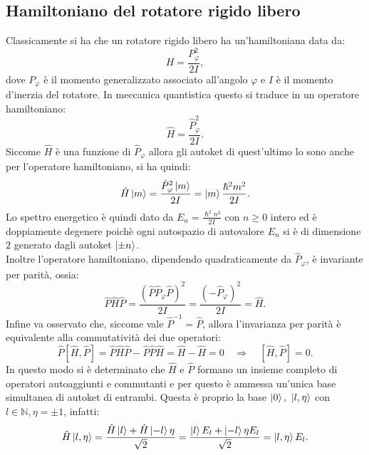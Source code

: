 \subsection{Hamiltoniano del rotatore rigido libero}
Classicamente si ha che un rotatore rigido libero ha un'hamiltoniana data da:
\begin{equation*}
    H=\frac{P^2_\varphi}{2I},
\end{equation*}
dove $P_\varphi$ è il momento generalizzato associato all'angolo $\varphi$ e $I$ è il momento d'inerzia del rotatore. In meccanica quantistica questo si traduce in un operatore hamiltoniano:
\begin{equation*}
    \hat H=\frac{\hat P^2_\varphi}{2I}.
\end{equation*}
Siccome $\hat H$ è una funzione di $\hat P_\varphi$ allora gli autoket di quest'ultimo lo sono anche per l'operatore hamiltoniano, si ha quindi:
\begin{equation*}
    \hat H\ket{m}=\frac{\hat P^2_\varphi\ket{m}}{2I}=\ket{m}\frac{\hslash^2m^2}{2I}.
\end{equation*}
Lo spettro energetico è quindi dato da $E_n=\frac{\hslash^2n^2}{2I}$ con $n\geq0$ intero ed è doppiamente degenere poichè ogni autospazio di autovalore $E_n$ si è di dimensione $2$ generato dagli autoket $\ket{\pm n}$.\\Inoltre l'operatore hamiltoniano, dipendendo quadraticamente da $\hat P_\varphi$, è invariante per parità, ossia:
\begin{equation*}
    \hat P\hat H \hat P=\frac{(\hat P\hat P_\varphi\hat P)^2}{2I}=\frac{(-\hat P_\varphi)^2}{2I}=\hat H.
\end{equation*}
Infine va osservato che, siccome vale $\hat P^{-1}=\hat P$, allora l'invarianza per parità è equivalente alla commutatività dei due operatori:
\begin{equation*}
    \hat P[\hat H,\hat P]=\hat P\hat H\hat P-\hat P\hat P\hat H=\hat H-\hat H=0\quad \Rightarrow \quad [\hat H,\hat P]=0.
\end{equation*}
In questo modo si è determinato che $\hat H$ e $\hat P$ formano un insieme completo di operatori autoaggiunti e commutanti e per questo è ammessa un'unica base simultanea di autoket di entrambi. Questa è proprio la base $\ket{0},\ \ket{l,\eta}$ con $l\in\mathbb{N}, \eta=\pm1$, infatti:
\begin{equation*}
    \hat H\ket{l,\eta}=\frac{\hat H\ket{l}+\hat H\ket{-l}\eta}{\sqrt{2}}=\frac{\ket{l}E_l+\ket{-l}\eta E_l}{\sqrt{2}}=\ket{l,\eta}E_l.
\end{equation*}
